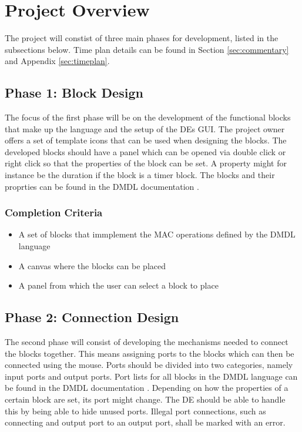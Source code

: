 \documentclass[12pt,twoside]{article}
\begin{document}
\section{Project Overview}
\label{sec:overview}

The project will constist of three main phases for development, listed in the subsections below. Time
plan details can be found in Section \ref{sec:commentary} and Appendix \ref{sec:timeplan}.

\subsection{Phase 1: Block Design}
The focus of the first phase will be on the development of the functional blocks that make up the language
and the setup of the DEs GUI. The project owner offers a set of template icons that can be used when
designing the blocks. The developed blocks should have a panel which can be opened via double click or right click
so that the properties of the block can be set. A property might for instance be the duration if the block is a timer block.
The blocks and their proprties can be found in the DMDL documentation \cite{dmdlgit}.
\subsubsection{Completion Criteria}
\begin{itemize}[label={\checkmark}]
\item A set of blocks that immplement the MAC operations defined by the DMDL language
\item A canvas where the blocks can be placed
\item A panel from which the user can select a block to place
\end{itemize}

\subsection{Phase 2: Connection Design}
The second phase will consist of developing the mechanisms needed to connect
the blocks together. This means assigning ports to the blocks which can then be connected using the mouse.
Ports should be divided into two categories, namely input ports and output ports. Port lists for all blocks
in the DMDL language can be found in the DMDL documentation \cite{dmdlgit}.
Depending on how the properties of a certain block are set, its port might change. The DE should
be able to handle this by being able to hide unused ports. Illegal port connections, such as connecting
and output port to an output port, shall be marked with an error.
\end{document}
